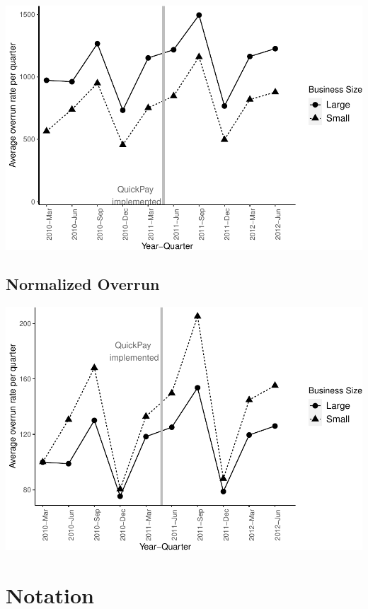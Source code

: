 \documentclass[
]{article}
\begin{document}
\includegraphics{qp_first_budget_overrun_files/figure-latex/plot-1.pdf}

\hypertarget{normalized-overrun}{%
\subsection{Normalized Overrun}\label{normalized-overrun}}

\includegraphics{qp_first_budget_overrun_files/figure-latex/normalized_plot-1.pdf}

\hypertarget{notation}{%
\section{Notation}\label{notation}}
\end{document}
